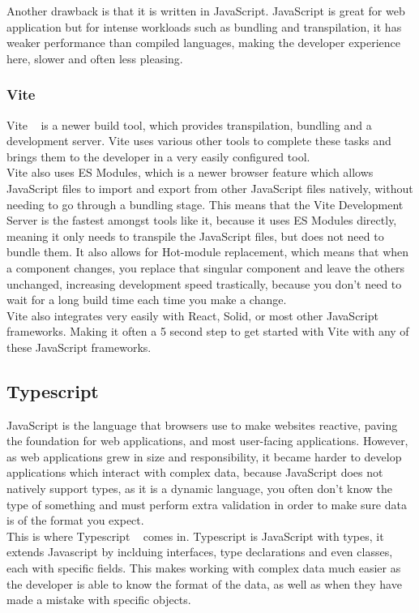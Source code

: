 \documentclass[titlepage]{article}
\begin{document}
Another drawback is that it is written in JavaScript. JavaScript is great for web application but for intense workloads such as bundling and transpilation, it has weaker performance than compiled languages, making the developer experience here, slower and often less pleasing.

\subsubsection{Vite}
Vite ~\cite{vite} is a newer build tool, which provides transpilation, bundling and a development server. Vite uses various other tools to complete these tasks and brings them to the developer in a very easily configured tool. \\

Vite also uses ES Modules, which is a newer browser feature which allows JavaScript files to import and export from other JavaScript files natively, without needing to go through a bundling stage. This means that the Vite Development Server is the fastest amongst tools like it, because it uses ES Modules directly, meaning it only needs to transpile the JavaScript files, but does not need to bundle them. It also allows for Hot-module replacement, which means that when a component changes, you replace that singular component and leave the others unchanged, increasing development speed trastically, because you don't need to wait for a long build time each time you make a change. \\

Vite also integrates very easily with React, Solid, or most other JavaScript frameworks. Making it often a 5 second step to get started with Vite with any of these JavaScript frameworks.

\subsection{Typescript}
JavaScript is the language that browsers use to make websites reactive, paving the foundation for web applications, and most user-facing applications. However, as web applications grew in size and responsibility, it became harder to develop applications which interact with complex data, because JavaScript does not natively support types, as it is a dynamic language, you often don't know the type of something and must perform extra validation in order to make sure data is of the format you expect. \\

This is where Typescript ~\cite{typescript} comes in. Typescript is JavaScript with types, it extends Javascript by inclduing interfaces, type declarations and even classes, each with specific fields. This makes working with complex data much easier as the developer is able to know the format of the data, as well as when they have made a mistake with specific objects. \\
\end{document}
